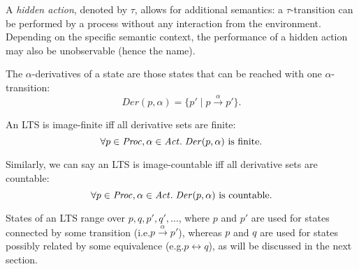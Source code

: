 \begin{isabellebody}
\begin{isamarkuptext}
{}

A \emph{hidden action}, denoted by $\tau$, allows for additional semantics: a $\tau$-transition can be performed by a process without any interaction from the environment. Depending on the specific semantic context, the performance of a hidden action may also be unobservable (hence the name).%
\end{isamarkuptext}\isamarkuptrue%
%
\isadelimdocument
%
\endisadelimdocument
%
\isatagdocument
%
\isamarkuptrue%
%
\endisatagdocument
{\isafolddocument}%
%
\isadelimdocument
%
\endisadelimdocument
%
\begin{isamarkuptext}%
The $\alpha$-derivatives of a state are those states that can be reached with one $\alpha$-transition:
$$\mathit{Der}(p, \alpha) = \{ p' \mid p \xrightarrow{\alpha} p' \}.$$

An LTS is image-finite iff all derivative sets are finite:
$$\forall p \in \mathit{Proc}, \alpha \in \mathit{Act} .\; \mathit{Der}(p, \alpha) \text{ is finite}.$$

Similarly, we can say an LTS is image-countable iff all derivative sets are countable:
$$\forall p \in \mathit{Proc}, \alpha \in \mathit{Act} .\; \mathit{Der}(p, \alpha) \text{ is countable}.$$%
\end{isamarkuptext}\isamarkuptrue%
%
\isadelimdocument
%
\endisadelimdocument
%
\isatagdocument
%
\isamarkuptrue%
%
\endisatagdocument
{\isafolddocument}%
%
\isadelimdocument
%
\endisadelimdocument
%
\begin{isamarkuptext}%
States of an LTS range over $p, q, p', q', \dots$, where $p$ and $p'$ are used for states connected by some transition (i.e.\@ $p \xrightarrow{\alpha} p'$), whereas $p$ and $q$ are used for states possibly related by some equivalence (e.g.\@ $p \leftrightarrow q$), as will be discussed in the next section.


\end{isamarkuptext}
\end{isabellebody}
